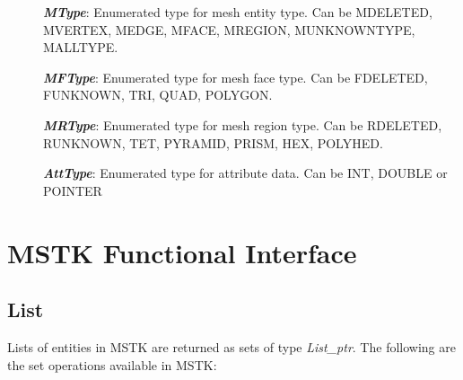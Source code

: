 \documentclass[12pt]{article}
\begin{document}
\begin{description}
\item[]\textbf{\textit{MType}}: Enumerated type for mesh entity type. Can be MDELETED, MVERTEX, MEDGE, MFACE, MREGION, MUNKNOWNTYPE, MALLTYPE.

\item[]\textbf{\textit{MFType}}: Enumerated type for mesh face type.
Can be FDELETED, FUNKNOWN, TRI, QUAD, POLYGON.

\item[]\textbf{\textit{MRType}}: Enumerated type for mesh region type.
Can be RDELETED, RUNKNOWN, TET, PYRAMID, PRISM, HEX, POLYHED.

\item[]\textbf{\textit{AttType}}: Enumerated type for attribute data. Can be INT, DOUBLE or POINTER
\end{description}

\newpage
\section{MSTK Functional Interface}
\subsection{List}

Lists of entities in MSTK are returned as sets of type
\textit{List\_ptr}. The following are the set operations available in
MSTK:
\end{document}
